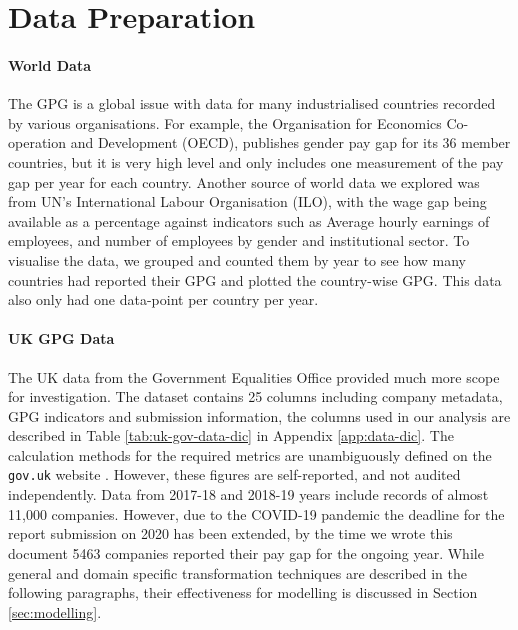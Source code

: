 \section{Data Preparation} 
\label{sec:data-prep}

\paragraph{World Data}
The GPG is a global issue with data for many industrialised countries recorded by various organisations. For example, the Organisation for Economics Co-operation and Development (OECD), publishes gender pay gap for its 36 member countries, but it is very high level and only includes one measurement of the pay gap per year for each country. Another source of world data we explored was from UN's International Labour Organisation (ILO), with the wage gap being available as a percentage against indicators such as Average hourly earnings of employees, and number of employees by gender and institutional sector.
To visualise the data, we grouped and counted them by year to see how many countries had reported their GPG and plotted the country-wise GPG. This data also only had one data-point per country per year.

\paragraph{UK GPG Data}
The UK data from the Government Equalities Office provided much more scope for investigation.
The dataset contains 25 columns including company metadata, GPG indicators and submission information, the columns used in our analysis are described in Table \ref{tab:uk-gov-data-dic} in Appendix \ref{app:data-dic}.  The calculation methods for the required metrics are unambiguously defined on the \texttt{gov.uk} website \cite{govuk-how-to-calculate}. However, these figures are self-reported, and not audited independently. Data from 2017-18 and 2018-19 years include records of almost 11,000 companies. However, due to the COVID-19 pandemic the deadline for the report submission on 2020 has been extended, by the time we wrote this document 5463 companies reported their pay gap for the ongoing year. While general and domain specific transformation techniques are described in the following paragraphs, their effectiveness for modelling is discussed in Section \ref{sec:modelling}.

